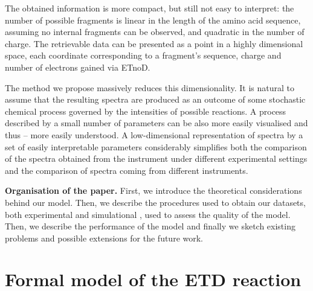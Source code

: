 \documentclass{llncs}
\begin{document}
        The obtained information is more compact, but still not easy to interpret: the number of possible fragments is linear in the length of the amino acid sequence, assuming no internal fragments can be observed, and quadratic in the number of charge. The retrievable data can be presented as a point in a highly dimensional space, each coordinate corresponding to a fragment’s sequence, charge and number of electrons gained via ETnoD.

        The method we propose massively reduces this dimensionality. It is natural to assume that the resulting spectra are produced as an outcome of some stochastic chemical process governed by the intensities of possible reactions. A process described by a small number of parameters can be also more easily visualised and thus -- more easily understood. A low-dimensional representation of spectra by a set of easily interpretable parameters considerably simplifies both the comparison of the spectra obtained from the instrument under different experimental settings and the comparison of spectra coming from different instruments.

\textbf{Organisation of the paper.}
        First, we introduce the theoretical considerations behind our model. Then, we describe the procedures used to obtain our datasets, both experimental and  simulational , used to assess the quality of the model. Then, we describe the performance of the model and finally we sketch existing problems and possible extensions for the future work.


\section{Formal model of the ETD reaction}
\end{document}
